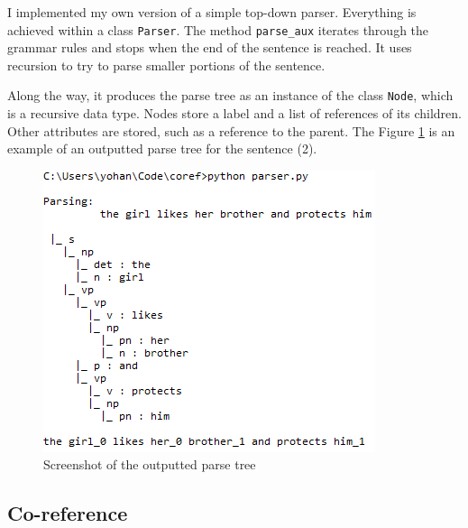 \documentclass[a4paper]{article}
\theoremstyle{definition}
\begin{document}
I implemented my own version of a simple top-down parser. Everything is achieved within a class \texttt{Parser}. The method \texttt{parse\_aux} iterates through the grammar rules and stops when the end of the sentence is reached. It uses recursion to try to parse smaller portions of the sentence.

Along the way, it produces the parse tree as an instance of the class \texttt{Node}, which is a recursive data type. Nodes store a label and a list of references of its children. Other attributes are stored, such as a reference to the parent. The Figure \ref{fig:screenshot} is an example of an outputted parse tree for the sentence (2).

\begin{figure}
\centering
\includegraphics[scale=1]{screenshot_parse_tree}
\caption{Screenshot of the outputted parse tree\label{fig:screenshot}}
\end{figure}

\subsection{Co-reference}
\end{document}
